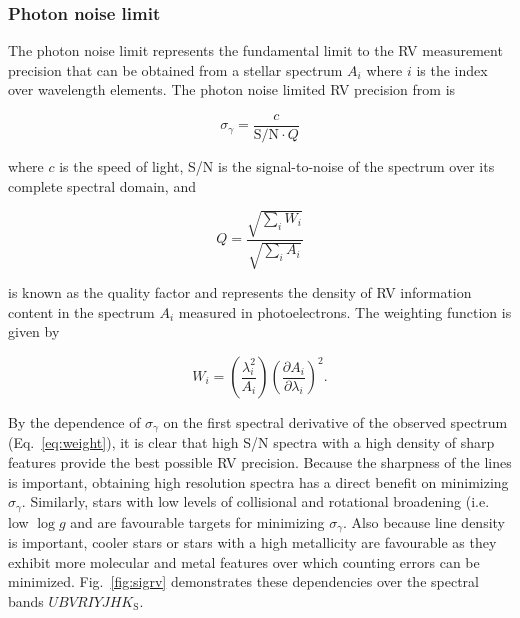 \subsubsection{Photon noise limit}
The photon noise limit represents the fundamental limit to the RV measurement precision that can
be obtained from a stellar spectrum $A_i$ where $i$ is the index over wavelength elements.
The photon noise limited RV precision from \cite{bouchy01} is

\begin{equation}
  \sigma_{\gamma} = \frac{c}{\text{S/N} \cdot Q}
\end{equation}

\noindent where $c$ is the speed of light, S/N is the signal-to-noise of the spectrum over its
complete spectral domain, and

\begin{equation}
  Q = \frac{\sqrt{\sum_i W_i}}{\sqrt{\sum_i A_i}}
\end{equation}

\noindent is known as the quality factor and represents the density of RV information content
in the spectrum $A_i$ measured in photoelectrons. The weighting function is given by

\begin{equation}
  W_i = \left( \frac{\lambda_i^2}{A_i} \right) \left( \frac{\partial A_i}{\partial \lambda_i} \right)^2.
  \label{eq:weight}
\end{equation}

By the dependence of $\sigma_{\gamma}$ on the first spectral derivative of the observed spectrum
(Eq.~\ref{eq:weight}), it is clear that
high S/N spectra with a high density of sharp features provide the
best possible RV precision. Because the sharpness of the lines is important, obtaining high
resolution spectra has a direct benefit on minimizing $\sigma_{\gamma}$. Similarly, stars
with low levels of collisional and rotational broadening (i.e. low $\log{g}$ and \vsini{)} are
favourable targets for minimizing $\sigma_{\gamma}$. Also because line density is important, cooler stars
or stars with a high metallicity are favourable as they exhibit more molecular and metal features over which
counting errors can be minimized. Fig.~\ref{fig:sigrv} demonstrates these dependencies over the spectral
bands $UBVRIYJHK_{\text{S}}$.

